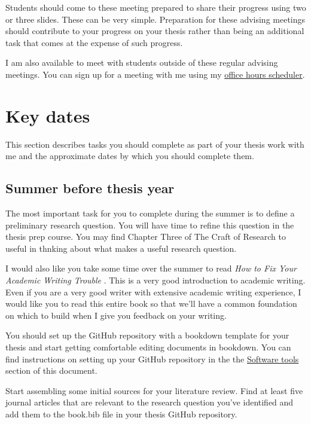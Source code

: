 \documentclass[]{tufte-book}
\begin{document}
Students should come to these meeting prepared to share their progress using two or three slides. These can be very simple. Preparation for these advising meetings should contribute to your progress on your thesis rather than being an additional task that comes at the expense of such progress.

I am also available to meet with students outside of these regular advising meetings. You can sign up for a meeting with me using my \href{https://carole-voulgaris.youcanbook.me/}{office hours scheduler}.

\hypertarget{key-dates}{%
\chapter{Key dates}\label{key-dates}}

This section describes tasks you should complete as part of your thesis work with me and the approximate dates by which you should complete them.

\hypertarget{summer-before-thesis-year}{%
\section{Summer before thesis year}\label{summer-before-thesis-year}}

The most important task for you to complete during the summer is to define a preliminary research question. You will have time to refine this question in the thesis prep course. You may find Chapter Three of The Craft of Research \citep{booth_chapter_2016} to useful in thnking about what makes a useful research question.

I would also like you take some time over the summer to read \emph{How to Fix Your Academic Writing Trouble} \citep{mewburn2018ebook}. This is a very good introduction to academic writing. Even if you are a very good writer with extensive academic writing experience, I would like you to read this entire book so that we'll have a common foundation on which to build when I give you feedback on your writing.

You should set up the GitHub repository with a bookdown template for your thesis and start getting comfortable editing documents in bookdown. You can find instructions on setting up your GitHub repository in the the \protect\hyperlink{software-tools}{Software tools} section of this document.

Start assembling some initial sources for your literature review. Find at least five journal articles that are relevant to the research question you've identified and add them to the book.bib file in your thesis GitHub repository.
\end{document}
